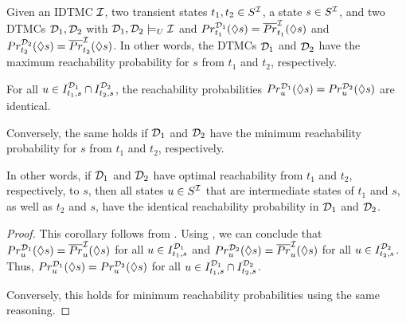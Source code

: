 \begin{corollary}\label{th:two_DTMCs_compatible_for_max_reach}
    Given an IDTMC $\mathcal{I}$, two transient states $t_1, t_2\in S^{\mathcal{I}}$, a state $s\in S^{\mathcal{I}}$, and two DTMCs $\mathcal{D}_1,\mathcal{D}_2$ with $\mathcal{D}_1,\mathcal{D}_2\models_U \mathcal{I}$ and $Pr^{\mathcal{D}_1}_{t_1}(\lozenge s) = \overline{Pr}^{\mathcal{I}}_{t_1}(\lozenge s)$ and $Pr^{\mathcal{D}_2}_{t_2}(\lozenge s) = \overline{Pr}^{\mathcal{I}}_{t_2}(\lozenge s)$. In other words, the DTMCs $\mathcal{D}_1$ and $\mathcal{D}_2$ have the maximum reachability probability for $s$ from $t_1$ and $t_2$, respectively.

    For all $u\in I^{\mathcal{D}_1}_{t_1,s} \cap I^{\mathcal{D}_2}_{t_2,s}$, the reachability probabilities $Pr^{\mathcal{D}_1}_u(\lozenge s) = Pr^{\mathcal{D}_2}_u(\lozenge s)$ are identical.

    Conversely, the same holds if $\mathcal{D}_1$ and $\mathcal{D}_2$ have the minimum reachability probability for $s$ from $t_1$ and $t_2$, respectively.
\end{corollary}
In other words, if $\mathcal{D}_1$ and $\mathcal{D}_2$ have optimal reachability from $t_1$ and $t_2$, respectively, to $s$, then all states $u\in S^{\mathcal{I}}$ that are intermediate states of $t_1$ and $s$, as well as $t_2$ and $s$, have the identical reachability probability in $\mathcal{D}_1$ and $\mathcal{D}_2$.

\begin{proof}
    This corollary follows from .
    Using , we can conclude that $Pr^{\mathcal{D}_1}_{u}(\lozenge s) = \overline{Pr}^{\mathcal{I}}_{u}(\lozenge s)$ for all $u \in I^{\mathcal{D}_1}_{t_1,s}$ and $Pr^{\mathcal{D}_2}_{u}(\lozenge s) = \overline{Pr}^{\mathcal{I}}_{u}(\lozenge s)$ for all $u \in I^{\mathcal{D}_2}_{t_2,s}$. Thus, $Pr^{\mathcal{D}_1}_u(\lozenge s) = Pr^{\mathcal{D}_2}_u(\lozenge s)$ for all $u\in I^{\mathcal{D}_1}_{t_1,s} \cap I^{\mathcal{D}_2}_{t_2,s}$.

    Conversely, this holds for minimum reachability probabilities using the same reasoning.
\end{proof}

